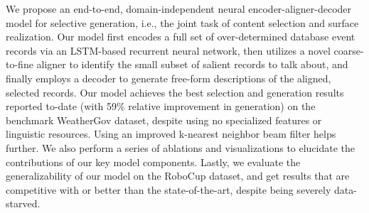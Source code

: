 We propose an end-to-end, domain-independent neural encoder-aligner-decoder model for selective generation, i.e., the joint task of content selection and surface realization. Our model first encodes a full set of over-determined database event records via an LSTM-based recurrent neural network, then utilizes a novel coarse-to-fine aligner to identify the small subset of salient records to talk about, and finally employs a decoder to generate free-form descriptions of the aligned, selected records. Our model achieves the best selection and generation results reported to-date (with 59\% relative improvement in generation) on the benchmark WeatherGov dataset, despite using no specialized features or linguistic resources. Using an improved k-nearest neighbor beam filter helps further. We also perform a series of ablations and visualizations to elucidate the contributions of our key model components. Lastly, we evaluate the generalizability of our model on the RoboCup dataset, and get results that are competitive with or better than the state-of-the-art, despite being severely data-starved.
